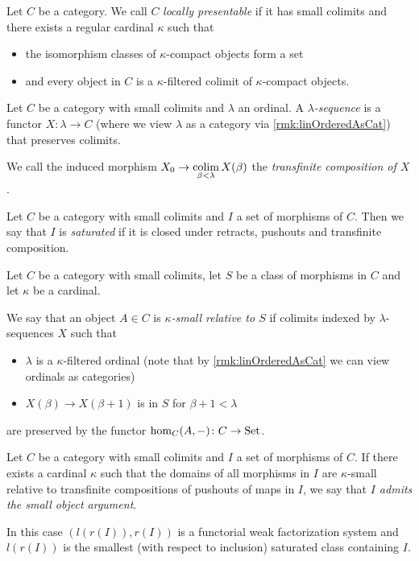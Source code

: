 \begin{definition} %
    Let $C$ be a category.
    We call $C$ \emph{locally presentable} if it has small colimits and there exists a regular cardinal $\kappa$ such that
    \begin{itemize}
        \item the isomorphism classes of $\kappa$-compact objects form a set
        \item and every object in $C$ is a $\kappa$-filtered colimit of $\kappa$-compact objects.
    \end{itemize}
\end{definition}
\begin{definition} %
    Let $C$ be a category with small colimits and $\lambda$ an ordinal.
    A \emph{$\lambda$-sequence} is a functor $X\colon\lambda\to C$ (where we view $\lambda$ as a category via \cref{rmk:linOrderedAsCat}) that preserves colimits.

    We call the induced morphism $X_0\to\operatorname*{colim}\limits_{\beta<\lambda} X(\beta)$ the \emph{transfinite composition of $X$}.
\end{definition}
\begin{definition}
    Let $C$ be a category with small colimits and $I$ a set of morphisms of $C$.
    Then we say that $I$ is \emph{saturated} if it is closed under retracts, pushouts and transfinite composition.
\end{definition}
\begin{definition}
    Let $C$ be a category with small colimits, let $S$ be a class of morphisms in $C$ and let $\kappa$ be a cardinal.
    
    We say that an object $A\in C$ is \emph{$\kappa$-small relative to $S$} if colimits indexed by $\lambda$-sequences $X$ such that 
    \begin{itemize}
        \item $\lambda$ is a $\kappa$-filtered ordinal (note that by \cref{rmk:linOrderedAsCat} we can view ordinals as categories)
        \item $X(\beta)\to X(\beta+1)$ is in $S$ for $\beta+1<\lambda$
    \end{itemize}
    are preserved by the functor $\hom_C(A,-)\colon C\to\operatorname{Set}$.
\end{definition}
\begin{thm}[Small Object Argument] %
    Let $C$ be a category with small colimits and $I$ a set of morphisms of $C$.
    If there exists a cardinal $\kappa$ such that the domains of all morphisms in $I$ are $\kappa$-small relative to transfinite compositions of pushouts of maps in $I$, we say that \emph{$I$ admits the small object argument}.
    
    In this case $(l(r(I)),r(I))$ is a functorial weak factorization system and $l(r(I))$ is the smallest (with respect to inclusion) saturated class containing $I$.
\end{thm}
